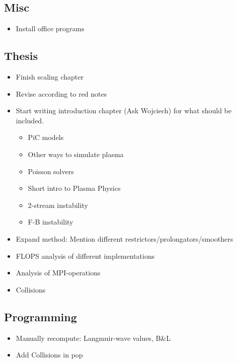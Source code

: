 \subsection{Misc}
    \begin{itemize}
        \item Install office programs
    \end{itemize}

\subsection{Thesis}
\begin{itemize}
  \item Finish scaling chapter
  \item Revise according to red notes
  \item Start writing introduction chapter (Ask Wojciech) for what should be included.
    \begin{itemize}
      \item PiC models
      \item Other ways to simulate plasma
      \item Poisson solvers
      \item Short intro to Plasma Physics
      \item 2-stream instability
      \item F-B instability
    \end{itemize}
  \item Expand method: Mention different restrictors/prolongators/smoothers
  \item FLOPS analysis of different implementations
  \item Analysis of MPI-operations
  \item Collisions
\end{itemize}

\subsection{Programming}
\begin{itemize}
  \item Manually recompute: Langmuir-wave values, B\&L
  \item Add Collisions in pop
\end{itemize}
